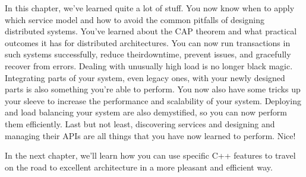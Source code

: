 In this chapter, we've learned quite a lot of stuff. You now know when to apply which service model and how to avoid the common pitfalls of designing distributed systems. You've learned about the CAP theorem and what practical outcomes it has for distributed architectures. You can now run transactions in such systems successfully, reduce theirdowntime, prevent issues, and gracefully recover from errors. Dealing with unusually high load is no longer black magic. Integrating parts of your system, even legacy ones, with your newly designed parts is also something you're able to perform. You now also have some tricks up your sleeve to increase the performance and scalability of your system. Deploying and load balancing your system are also demystified, so you can now perform them efficiently. Last but not least, discovering services and designing and managing their APIs are all things that you have now learned to perform. Nice!

In the next chapter, we'll learn how you can use specific C++ features to travel on the road to excellent architecture in a more pleasant and efficient way.
